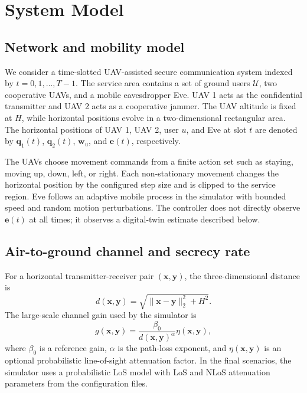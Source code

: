 \section{System Model}
\label{sec:model}

\subsection{Network and mobility model}

We consider a time-slotted UAV-assisted secure communication system indexed by $t=0,1,\ldots,T-1$. The service area contains a set of ground users $\mathcal{U}$, two cooperative UAVs, and a mobile eavesdropper Eve. UAV 1 acts as the confidential transmitter and UAV 2 acts as a cooperative jammer. The UAV altitude is fixed at $H$, while horizontal positions evolve in a two-dimensional rectangular area. The horizontal positions of UAV 1, UAV 2, user $u$, and Eve at slot $t$ are denoted by $\mathbf{q}_1(t)$, $\mathbf{q}_2(t)$, $\mathbf{w}_u$, and $\mathbf{e}(t)$, respectively.

The UAVs choose movement commands from a finite action set such as staying, moving up, down, left, or right. Each non-stationary movement changes the horizontal position by the configured step size and is clipped to the service region. Eve follows an adaptive mobile process in the simulator with bounded speed and random motion perturbations. The controller does not directly observe $\mathbf{e}(t)$ at all times; it observes a digital-twin estimate described below.

\subsection{Air-to-ground channel and secrecy rate}

For a horizontal transmitter-receiver pair $(\mathbf{x},\mathbf{y})$, the three-dimensional distance is
\begin{equation}
    d(\mathbf{x},\mathbf{y})=
    \sqrt{\|\mathbf{x}-\mathbf{y}\|_2^2+H^2}.
\end{equation}
The large-scale channel gain used by the simulator is
\begin{equation}
    g(\mathbf{x},\mathbf{y})=
    \frac{\beta_0}{d(\mathbf{x},\mathbf{y})^\alpha}\eta(\mathbf{x},\mathbf{y}),
\end{equation}
where $\beta_0$ is a reference gain, $\alpha$ is the path-loss exponent, and $\eta(\mathbf{x},\mathbf{y})$ is an optional probabilistic line-of-sight attenuation factor. In the final scenarios, the simulator uses a probabilistic LoS model with LoS and NLoS attenuation parameters from the configuration files.

